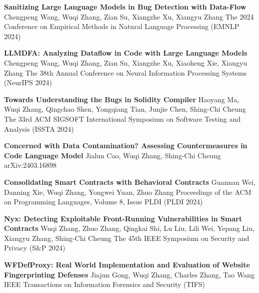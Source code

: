 %
%
%


\begin{scholarship}
	{\textbf{Sanitizing Large Language Models in Bug Detection with Data-Flow}}
	{Chengpeng Wang, Wuqi Zhang, Zian Su, Xiangzhe Xu, Xiangyu Zhang}
	\scholarshipentry{}
	{The 2024 Conference on Empirical Methods in Natural Language Processing (EMNLP 2024)}

	{\textbf{LLMDFA: Analyzing Dataflow in Code with Large Language Models}}
	{Chengpeng Wang, Wuqi Zhang, Zian Su, Xiangzhe Xu, Xiaoheng Xie, Xiangyu Zhang}
	\scholarshipentry{}
	{The 38th Annual Conference on Neural Information Processing Systems (NeurIPS 2024)}

	{\textbf{Towards Understanding the Bugs in Solidity Compiler}}
	{Haoyang Ma, Wuqi Zhang, Qingchao Shen, Yongqiang Tian, Junjie Chen, Shing-Chi Cheung}
	\scholarshipentry{}
	{The 33rd ACM SIGSOFT International Symposium on Software Testing and Analysis (ISSTA 2024)}

	{\textbf{Concerned with Data Contamination? Assessing Countermeasures in Code Language Model}}
	{Jialun Cao, Wuqi Zhang, Shing-Chi Cheung}
	\scholarshipentry{}
	{arXiv:2403.16898}

	{\textbf{Consolidating Smart Contracts with Behavioral Contracts}}
	{Guannan Wei, Danning Xie, Wuqi Zhang, Yongwei Yuan, Zhuo Zhang}
	\scholarshipentry{}
	{Proceedings of the ACM on Programming Languages, Volume 8, Issue PLDI (PLDI 2024)}

	{\textbf{Nyx: Detecting Exploitable Front-Running Vulnerabilities in Smart Contracts}}
	{Wuqi Zhang, Zhuo Zhang, Qingkai Shi, Lu Liu, Lili Wei, Yepang Liu, Xiangyu Zhang, Shing-Chi Cheung}
	\scholarshipentry{}
	{The 45th IEEE Symposium on Security and Privacy (S\&P 2024)}

	{\textbf{WFDefProxy: Real World Implementation and Evaluation of Website Fingerprinting Defenses}}
	{Jiajun Gong, Wuqi Zhang, Charles Zhang, Tao Wang}
	\scholarshipentry{}
	{IEEE Transactions on Information Forensics and Security (TIFS)}


\end{scholarship}

